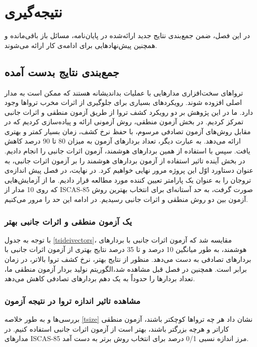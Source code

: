 
\chapter{نتیجه‌گیری}

در این فصل، ضمن جمع‌بندی نتایج جدید ارائه‌شده در پایان‌نامه، 
مسائل باز باقی‌مانده و همچنین پیش‌نهادهایی برای ادامه‌ی کار ارائه می‌شوند.

\section{جمع‌بندی نتایج بدست آمده}
تروا‌های سخت‌افزاری مدارهایی با عملیات بداندیشانه هستند که ممکن است به مدار اصلی افزوده شوند. رویکردهای بسیاری برای جلوگیری از اثرات مخرب ترواها وجود دارد. ما در این پژوهش بر دو رویکرد کشف تروا از طریق آزمون منطقی و اثرات جانبی تمرکز کردیم. در بخش آزمون منطقی، روش آزمونی ارائه و پیاده‌سازی کردیم که در مقابل روش‌های آزمون تصادفی مرسوم، با حفظ نرخ کشف، زمان بسیار کمتر و بهتری ارائه می‌دهد. به عبارت دیگر، تعداد بردارهای آزمون به میزان 80 تا 90 درصد کاهش یافت. سپس با استفاده از همین بردارهای هوشمند، آزمون اثرات جانبی را انجام دادیم. در بخش آینده تاثیر استفاده از آزمون بردارهای هوشمند را بر آزمون اثرات جانبی، به عنوان دستاورد اوّل این پروژه مرور نهایی خواهیم کرد. در نهایت، در فصل پیش اندازه‌ی تروجان را به عنوان یک پارامتر تعیین کننده مورد مطالعه قرار دادیم. ما از آزمایش‌هایی که روی 10 مدار از ISCAS-85 صورت گرفت، به حد آستانه‌ای برای انتخاب بهترین روش آزمون بین دو روش منطقی و اثرات جانبی رسیدیم. در ادامه این حد را مرور می‌کنیم.
\subsection{یک آزمون منطقی و اثرات جانبی بهتر}
با توجه به جدول \ref{tsideivectors}، مقایسه شد که آزمون اثرات جانبی با بردارهای هوشمند، به طور میانگین 10 درصد و تا 35 درصد نتایج بهتری از آزمون اثرات جانبی با بردارهای تصادفی به دست می‌دهد. منظور از نتایج بهتر، نرخ کشف تروا بالاتر، در زمان برابر است. همچنین  در فصل قبل مشاهده شد،الگوریتم نولید بردار آزمون منطقی ما، تعداد بردارها را حدوداً به یک دهم بردارهای تصادفی کاهش می‌دهد.


\subsection{مشاهده تاثیر اندازه تروا در نتیجه آزمون}
بررسی‌ها و به طور خلاصه \ref{tsize} نشان داد هر چه تروا‌ها کوچکتر باشند، آزمون منطقی کارا‌تر و هرچه بزرگتر باشند، بهتر است از آزمون اثرات جانبی استفاده کنیم. در مدارهای ISCAS-85 مرز اندازه نسبی 0/1 درصد برای انتخاب روش برتر به دست آمد.

